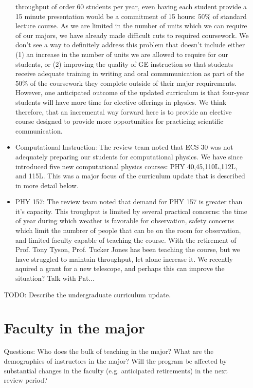 \documentclass[12pt]{article}
\begin{document}
\begin{itemize}
  throughput of order 60 students per year, even having each student
  provide a 15 minute presentation would be a commitment of 15 hours:
  50\% of standard lecture course.  As we are limited in the number of
  units which we can require of our majors, we have already made
  difficult cuts to required coursework.  We don't see a way to
  definitely address this problem that doesn't include either (1) an
  increase in the number of units we are allowed to require for our
  students, or (2) improving the quality of GE instruction so that
  students receive adequate training in writing and oral
  commmunication as part of the 50\% of the coursework they complete
  outside of their major requirements.  However, one anticipated
  outcome of the updated curriculum is that four-year students will
  have more time for elective offerings in physics.  We think
  therefore, that an incremental way forward here is to provide an
  elective course designed to provide more opportunities for
  practicing scientific communication.
\item Computational Instruction: The review team noted that ECS 30 was
  not adequately preparing our students for computational physics.  We
  have since introduced five new computational physics courses: PHY
  40,45,110L,112L, and 115L.  This was a major focus of the curriculum
  update that is described in more detail below.
\item PHY 157: The review team noted that demand for PHY 157 is
  greater than it's capacity.  This troughput is limited by several
  practical concerns: the time of year during which weather is
  favorable for observation, safety concerns which limit the numbrer
  of people that can be on the room for observation, and limited
  faculty capable of teaching the course.  With the retirement of
  Prof. Tony Tyson, Prof. Tucker Jones has been teaching the course,
  but we have struggled to maintain throughput, let alone increase it.
  We recently aquired a grant for a new telescope, and perhaps this
  can improve the situation?  Talk with Pat...
\end{itemize}

{\color{red} TODO:  Describe the undergraduate curriculum update.}

\section{Faculty in the major}
{\color{red} Questions: Who does the bulk of teaching in the major? What are the demographics of instructors in the major? Will the program be affected by substantial changes in the faculty (e.g. anticipated retirements) in the next review period?}
\end{document}
